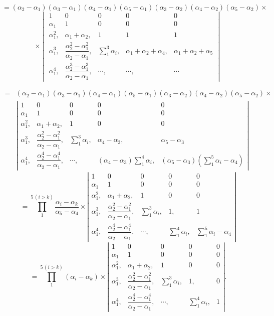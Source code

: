 \documentclass[11pt]{article}
\providecommand{\weberpage}[1]{}
\begin{document}
\[
= (\alpha_2-\alpha_1)(\alpha_3-\alpha_1)(\alpha_4-\alpha_1)(\alpha_5-\alpha_1)(\alpha_3-\alpha_2)(\alpha_4-\alpha_2)(\alpha_5-\alpha_2) \times
\]
\[
\times \begin{vmatrix}
1 & 0 & 0 & 0 & 0\\
\alpha_1 & 1 & 0 & 0 & 0\\
\alpha_1^2, & \alpha_1+\alpha_2, & 1 & 1 & 1\\
\alpha_1^3, & \dfrac{\alpha_2^2-\alpha_1^2}{\alpha_2-\alpha_1}, & \displaystyle\sum_{1}^{3}\alpha_i, & \alpha_1+\alpha_2+\alpha_4, & \alpha_1+\alpha_2+\alpha_5\\
\alpha_1^4, & \dfrac{\alpha_2^3-\alpha_1^3}{\alpha_2-\alpha_1}, & \cdots, & \cdots, & \cdots
\end{vmatrix}
\]


\weberpage{45}
{\footnotesize
\[
\begin{aligned}
={}& (\alpha_2-\alpha_1)(\alpha_3-\alpha_1)(\alpha_4-\alpha_1)(\alpha_5-\alpha_1)(\alpha_3-\alpha_2)(\alpha_4-\alpha_2)(\alpha_5-\alpha_2) \times\\
&
\left|
\begin{array}{lllll}
1 & 0 & 0 & 0 & 0 \\
\alpha_1 & 1 & 0 & 0 & 0 \\
\alpha_1^2, & \alpha_1+\alpha_2, & 1 & 0 & 0 \\
\alpha_1^3, & \dfrac{\alpha_2^2-\alpha_1^2}{\alpha_2-\alpha_1}, & \displaystyle\sum_1^3\alpha_i, & \alpha_4-\alpha_3, & \alpha_5-\alpha_3 \\
\alpha_1^4, & \dfrac{\alpha_2^4-\alpha_1^4}{\alpha_2-\alpha_1}, & \cdots, & (\alpha_4-\alpha_3)\displaystyle\sum_1^4\alpha_i, & (\alpha_5-\alpha_3)\left(\displaystyle\sum_1^5\alpha_i-\alpha_4\right)
\end{array}
\right|
\end{aligned}
\]
}
\[
= \prod_1^{5\,(i>k)} \frac{\alpha_i-\alpha_k}{\alpha_5-\alpha_4} \times
\left|
\begin{array}{lllll}
1 & 0 & 0 & 0 & 0 \\
\alpha_1 & 1 & 0 & 0 & 0 \\
\alpha_1^2, & \alpha_1+\alpha_2, & 1 & 0 & 0 \\
\alpha_1^3, & \dfrac{\alpha_2^2-\alpha_1^2}{\alpha_2-\alpha_1}, & \displaystyle\sum_1^3\alpha_i, & 1, & 1 \\
\alpha_1^4, & \dfrac{\alpha_2^4-\alpha_1^4}{\alpha_2-\alpha_1}, & \cdots, & \displaystyle\sum_1^4\alpha_i, & \displaystyle\sum_1^5\alpha_i-\alpha_4
\end{array}
\right|
\]
\[
= \prod_1^{5\,(i>k)} (\alpha_i-\alpha_k) \times
\left|
\begin{array}{lllll}
1 & 0 & 0 & 0 & 0 \\
\alpha_1 & 1 & 0 & 0 & 0 \\
\alpha_1^2, & \alpha_1+\alpha_2, & 1 & 0 & 0 \\
\alpha_1^3, & \dfrac{\alpha_2^2-\alpha_1^2}{\alpha_2-\alpha_1}, & \displaystyle\sum_1^3\alpha_i, & 1, & 0 \\
\alpha_1^4, & \dfrac{\alpha_2^4-\alpha_1^4}{\alpha_2-\alpha_1}, & \cdots, & \displaystyle\sum_1^4\alpha_i, & 1
\end{array}
\right|.
\]
\end{document}
